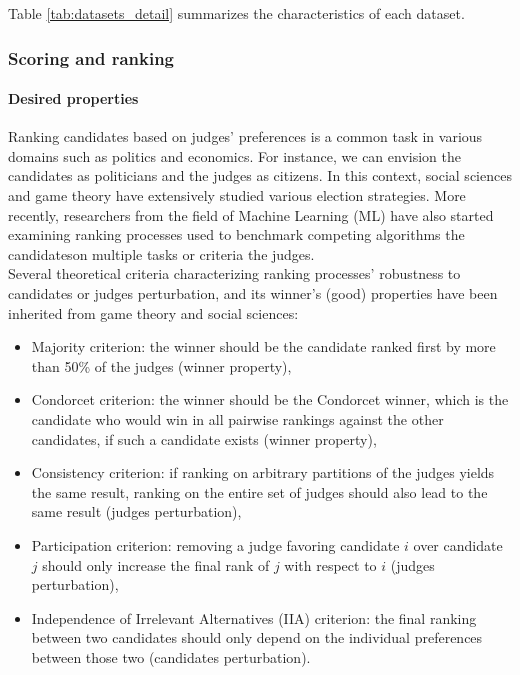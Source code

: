 \documentclass{article}
\begin{document}
Table \ref{tab:datasets_detail} summarizes the characteristics of each dataset.



\subsubsection{Scoring and ranking}\label{subsubsec:scoring-ranking}

\paragraph{Desired properties}\label{paragraph:desired-properties}

Ranking candidates based on judges' preferences is a common task in various domains such as politics and economics.
For instance, we can envision the candidates as politicians and the judges as citizens.
In this context, social sciences and game theory have extensively studied various election strategies.
More recently, researchers from the field of Machine Learning (ML) have also started examining ranking processes used to benchmark competing algorithms \textendash the candidates\textendash \space on multiple tasks or criteria \textendash the judges\textendash. \\

Several theoretical criteria characterizing ranking processes' robustness to candidates or judges perturbation, and its winner's (good) properties have been inherited from game theory and social sciences:
\begin{itemize}
    \item Majority criterion: the winner should be the candidate ranked first by more than 50\% of the judges (winner property),
    \item Condorcet criterion: the winner should be the Condorcet winner, which is the candidate who would win in all pairwise rankings against the other candidates, if such a candidate exists (winner property),
    \item Consistency criterion: if ranking on arbitrary partitions of the judges yields the same result, ranking on the entire set of judges should also lead to the same result (judges perturbation),
    \item Participation criterion: removing a judge favoring candidate $i$ over candidate $j$ should only increase the final rank of $j$ with respect to $i$ (judges perturbation),
    \item Independence of Irrelevant Alternatives (IIA) criterion: the final ranking between two candidates should only depend on the individual preferences between those two (candidates perturbation).
\end{itemize}
\end{document}
